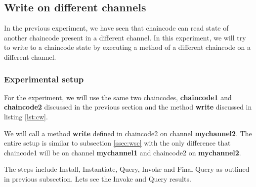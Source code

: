 \documentclass[
  a4paper,  %
  twoside,  %
  bibliography=totoc,
  headsepline,
  cleardoublepage=empty,
  parskip=half,
  draft=false
]{scrbook}
\begin{document}
\subsection{Write on different channels}
In the previous experiment, we have seen that chaincode can read state of another chaincode present in a different channel. In this experiment, we will try to write to a chaincode state by executing a method of a different chaincode on a different channel.

\subsubsection{Experimental setup}
For the experiment, we will use the same two chaincodes, \textbf{chaincode1} and \textbf{chaincode2} discussed in the previous section and the method \textbf{write} discussed in listing \ref{lst:cw}.

We will call a method \textbf{write} defined in chaincode2 on channel \textbf{mychannel2}. The entire setup is similar to subsection \ref{ssec:wsc} with the only difference that chaincode1 will be on channel \textbf{mychannel1} and chaincode2 on \textbf{mychannel2}. 

The steps include Install, Instantiate, Query, Invoke and Final Query as outlined in previous subsection. Lets see the Invoke and Query results.
\clearpage
\end{document}
